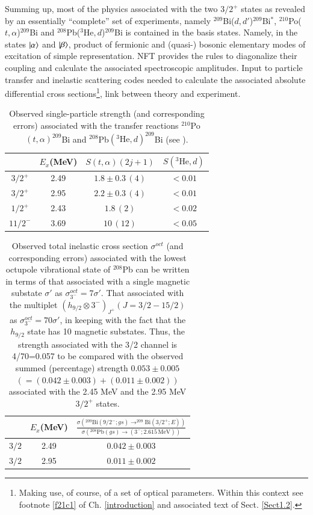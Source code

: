 Summing up, most of the physics associated with the two $3/2^+$ states as revealed by an essentially ``complete'' set of experiments, namely $^{209}$Bi($d,d'$)$^{209}$Bi$^*$, $^{210}$Po($t,\alpha$)$^{209}$Bi and $^{208}$Pb($^3\text{He},d$)$^{209}$Bi is contained in the basis states. Namely, in the states $|{\alpha} \rangle$ and $|{\beta} \rangle$, product of fermionic and (quasi-) bosonic
 elementary modes of excitation of simple representation. NFT provides the rules to diagonalize their coupling and calculate the associated spectroscopic amplitudes. Input to particle transfer and inelastic scattering codes needed to calculate the associated absolute differential cross sections\footnote{Making use, of course, of a set of optical parameters. Within this context see footnote \ref{f21c1} of Ch. \ref{introduction} and associated text of Sect. \ref{Sect1.2}.}, link between theory and experiment.  
\begin{table}
	\begin{tabular}{|c|c|c|c|}
		\hline 
		& $E_x$(MeV) & $S(t,\alpha)(2j+1)$ & $S(^3\text{He},d)$ \\
		\hline 
		$3/2^+$ & 2.49 & $1.8\pm0.3\,(4)$  & $<0.01$  \\ 
		$3/2^+$ & 2.95 & $2.2\pm0.3\,(4)$  & $<0.01$ \\ 
		$1/2^+$& 2.43 &  $1.8\,(2)$& $<0.02$ \\ 
		$11/2^-$& 3.69 & $10\,(12)$ &  $<0.05$\\ 
		\hline
	\end{tabular}\caption{Observed single-particle strength (and corresponding errors) associated with the  transfer reactions  $^{210}$Po$(t,\alpha)^{209}$Bi and $^{208}$Pb$(^3\text{He},d)^{209}$Bi (see \cite{Bortignon:77}).}\label{tabintroC1}
\end{table}
\begin{table}
	\begin{tabular}{|c|c|c|}
		\hline 
		& $E_x$(MeV) & $\frac{\sigma\left(^{209}\text{Bi}(9/2^-;gs)\rightarrow^{209}\text{Bi}(3/2^+;E)\right)}{\sigma\left(^{208}\text{Pb}(gs)\rightarrow (3^-;2.615\, \text{MeV})\right)}$  \\
		\hline 
		$3/2$ & 2.49 & $0.042\pm0.003$   \\ 
		$3/2$ & 2.95 & $0.011\pm0.002$  \\ 
		\hline
	\end{tabular}\caption{Observed total inelastic cross section $\sigma^{oct}$ (and corresponding errors) associated with the lowest octupole vibrational state of $^{208}$Pb can be written in terms of that associated with a single magnetic substate $\sigma'$ as $\sigma_{3^-}^{oct}=7\sigma'$. That associated with the multiplet $(h_{9/2}\otimes 3^-)_{J^+} (J=3/2-15/2)$ as $\sigma_{3^-}^{oct}=70\sigma'$, in keeping with the fact that the $h_{9/2}$ state has 10 magnetic substates. Thus, the strength associated with the 3/2 channel is 4/70=0.057 to be compared with the observed summed (percentage) strength $0.053\pm0.005 $ $(=(0.042\pm0.003)+(0.011\pm0.002))$ associated with the 2.45 MeV and the 2.95 MeV $3/2^+$ states.}\label{tabintroC2}
\end{table}
